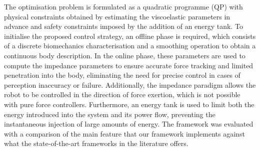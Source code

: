 The optimisation problem is formulated as a quadratic programme (QP) with physical constraints obtained by estimating the viscoelastic parameters in advance and safety constraints imposed by the addition of an energy tank.  To initialise the proposed control strategy, an offline phase is required, which consists of a discrete biomechanics characterisation and a smoothing operation to obtain a continuous body description.  In the online phase, these parameters are used to compute the impedance parameters to ensure accurate force tracking and limited penetration into the body, eliminating the need for precise control in cases of perception inaccuracy or failure.  
Additionally, the impedance paradigm allows the robot to be controlled in the direction of force exertion, which is not possible with pure force controllers. Furthermore, an energy tank is used to limit both the energy introduced into the system and its power flow, preventing the instantaneous injection of large amounts of energy. The framework was evaluated with a comparison of the main feature that our framework implements against what the state-of-the-art frameworks in the literature offers.%

